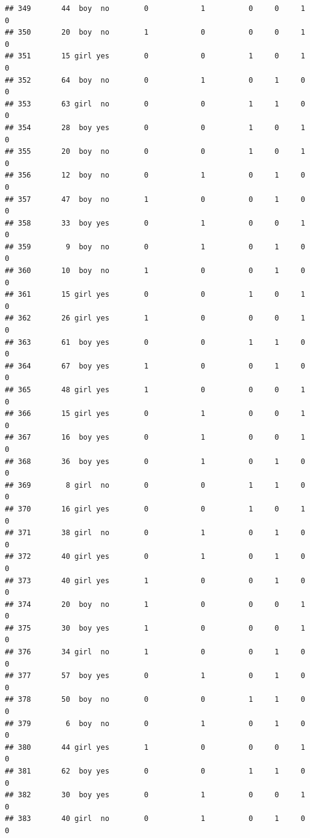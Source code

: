 \documentclass[man]{apa6}
\begin{document}
\begin{verbatim}
## 349       44  boy  no        0            1          0     0     1     0
## 350       20  boy  no        1            0          0     0     1     0
## 351       15 girl yes        0            0          1     0     1     0
## 352       64  boy  no        0            1          0     1     0     0
## 353       63 girl  no        0            0          1     1     0     0
## 354       28  boy yes        0            0          1     0     1     0
## 355       20  boy  no        0            0          1     0     1     0
## 356       12  boy  no        0            1          0     1     0     0
## 357       47  boy  no        1            0          0     1     0     0
## 358       33  boy yes        0            1          0     0     1     0
## 359        9  boy  no        0            1          0     1     0     0
## 360       10  boy  no        1            0          0     1     0     0
## 361       15 girl yes        0            0          1     0     1     0
## 362       26 girl yes        1            0          0     0     1     0
## 363       61  boy yes        0            0          1     1     0     0
## 364       67  boy yes        1            0          0     1     0     0
## 365       48 girl yes        1            0          0     0     1     0
## 366       15 girl yes        0            1          0     0     1     0
## 367       16  boy yes        0            1          0     0     1     0
## 368       36  boy yes        0            1          0     1     0     0
## 369        8 girl  no        0            0          1     1     0     0
## 370       16 girl yes        0            0          1     0     1     0
## 371       38 girl  no        0            1          0     1     0     0
## 372       40 girl yes        0            1          0     1     0     0
## 373       40 girl yes        1            0          0     1     0     0
## 374       20  boy  no        1            0          0     0     1     0
## 375       30  boy yes        1            0          0     0     1     0
## 376       34 girl  no        1            0          0     1     0     0
## 377       57  boy yes        0            1          0     1     0     0
## 378       50  boy  no        0            0          1     1     0     0
## 379        6  boy  no        0            1          0     1     0     0
## 380       44 girl yes        1            0          0     0     1     0
## 381       62  boy yes        0            0          1     1     0     0
## 382       30  boy yes        0            1          0     0     1     0
## 383       40 girl  no        0            1          0     1     0     0

\end{verbatim}
\end{document}
